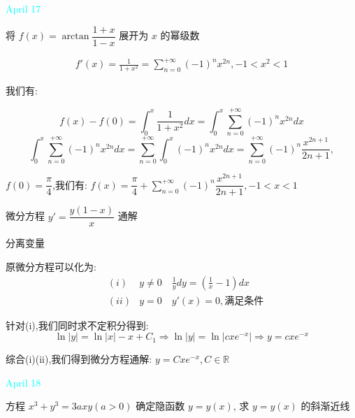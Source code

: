 \textcolor{cyan}{April 17}

\begin{example}[][Exam: 30.3.5]
	将 $f(x)=\arctan\dfrac{1+x}{1-x}$ 展开为 $x$ 的幂级数
\end{example}

\begin{solution}
	\begin{eqnarray*}
		f'(x)=\frac{1}{1+x^2}=\sum\limits_{n=0}^{+\infty}(-1)^nx^{2n}, -1<x^2<1
	\end{eqnarray*}

	我们有: 
	
	$$f(x)-f(0)=\int_{0}^{x}\frac{1}{1+x^2}dx=\int_{0}^{x}\sum\limits_{n=0}^{+\infty}(-1)^nx^{2n}dx$$
	$$\int_{0}^{x}\sum\limits_{n=0}^{+\infty}(-1)^nx^{2n}dx=\sum\limits_{n=0}^{+\infty}\int_{0}^{x}(-1)^{n}x^{2n}dx=\sum\limits_{n=0}^{+\infty}(-1)^n\dfrac{x^{2n+1}}{2n+1},$$
	
	$f(0)=\dfrac{\pi}{4}$,我们有: $f(x)=\dfrac{\pi}{4}+\sum\limits_{n=0}^{+\infty}(-1)^n\dfrac{x^{2n+1}}{2n+1},-1<x<1$
	
\end{solution}

\begin{example}[][Exam: 30.3.6]
	微分方程 $y'=\dfrac{y(1-x)}{x}$ 通解
\end{example}

\begin{solution}
	
	分离变量
	
	原微分方程可以化为: 
	\begin{eqnarray*}
		&(i) &y\neq 0\quad\frac{1}{y}dy=(\frac{1}{x}-1)dx\\
		&(ii)&y=0\quad y'(x)=0,\text{满足条件}
	\end{eqnarray*}
	
	针对(i),我们同时求不定积分得到: 
	$$\ln|y|=\ln|x|-x+C_{1}\Rightarrow \ln|y|=\ln|cxe^{-x}|\Rightarrow y=cxe^{-x}$$
	
	综合(i)(ii),我们得到微分方程通解: $y=Cxe^{-x},C\in \mathbb{R}$
\end{solution}


\textcolor{cyan}{April 18}

\begin{example}[][Exam: 30.3.7]
	方程 $x^3+y^3=3axy(a>0)$ 确定隐函数 $y=y(x)$, 求 $y=y(x)$ 的斜渐近线
\end{example}

